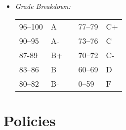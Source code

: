 \documentclass[article,oneside]{memoir}
\begin{document}
\begin{itemize}
\item \textit{Grade Breakdown:}

 \begin{tabular}{ | l | l | p{2cm} | l | l | }
    \hline 
96--100 & A  & &  77--79 &  C+ \\  
90--95 & A- & &  73--76 & C \\
87-89 & B+ &  &  70--72 & C- \\ 
83--86 & B  & &  60--69 & D\\
80--82 & B- & & 0--59 & F\\ \hline
    \end{tabular}


\end{itemize}


\section{Policies}
\end{document}
